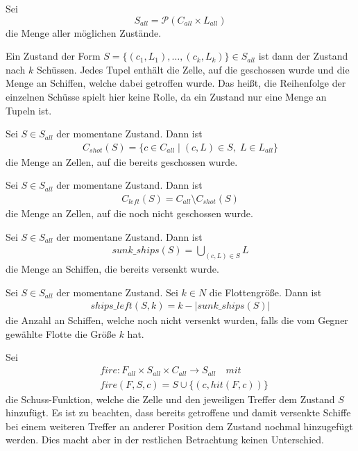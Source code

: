 \documentclass[a4paper,12pt]{llncs}
\numberwithin{equation}{section}
\begin{document}
\begin{definition}
Sei
\[
S_{all}=\mathscr{P}(C_{all}\times L_{all})
\]
die Menge aller möglichen Zustände.

Ein Zustand der Form $S=\{(c_1, L_1), \dots , (c_k, L_k)\}\in S_{all}$ ist dann der Zustand nach $k$ Schüssen.
Jedes Tupel enthält die Zelle, auf die geschossen wurde und die Menge an Schiffen, welche dabei getroffen wurde.
Das heißt, die Reihenfolge der einzelnen Schüsse spielt hier keine Rolle, da ein Zustand nur eine Menge an Tupeln ist.
\end{definition}

\begin{definition}
Sei $S\in S_{all}$ der momentane Zustand.
Dann ist
\begin{align}
C_{shot}(S)=\{c \in C_{all} \mid (c,L) \in S, \; L \in L_{all}\}
\end{align}
 die Menge an Zellen, auf die bereits geschossen wurde.
\end{definition}

\begin{definition}
Sei $S\in S_{all}$ der momentane Zustand.
Dann ist 
\begin{align}
C_{left}(S)=C_{all} \setminus C_{shot}(S)
\end{align}
die Menge an Zellen, auf die noch nicht geschossen wurde.
\end{definition}

\begin{definition}
Sei $S\in S_{all}$ der momentane Zustand.
Dann ist 
\begin{align}
sunk\_ships(S)=\bigcup_{(c,L) \in S} L
\end{align}
die Menge an Schiffen, die bereits versenkt wurde.
\end{definition}

\begin{definition}
Sei $S\in S_{all}$ der momentane Zustand.
Sei $k \in N$ die Flottengröße.
Dann ist 
\begin{align}
ships\_left(S, k)=k - |sunk\_ships(S)|
\end{align}
die Anzahl an Schiffen, welche noch nicht versenkt wurden, falls die vom Gegner gewählte Flotte die Größe $k$ hat.
\end{definition}

\begin{definition}
Sei
\begin{align}
&fire:F_{all}\times S_{all}\times C_{all} \rightarrow S_{all} \quad mit \nonumber\\
&fire(F, S, c)=S \cup \{(c,hit(F, c))\}  \nonumber
\end{align}
die Schuss-Funktion, welche die Zelle und den jeweiligen Treffer dem Zustand $S$ hinzufügt.
Es ist zu beachten, dass bereits getroffene und damit versenkte Schiffe bei einem weiteren Treffer an anderer Position dem Zustand nochmal hinzugefügt werden. Dies macht aber in der restlichen Betrachtung keinen Unterschied.
\end{definition}
\end{document}
